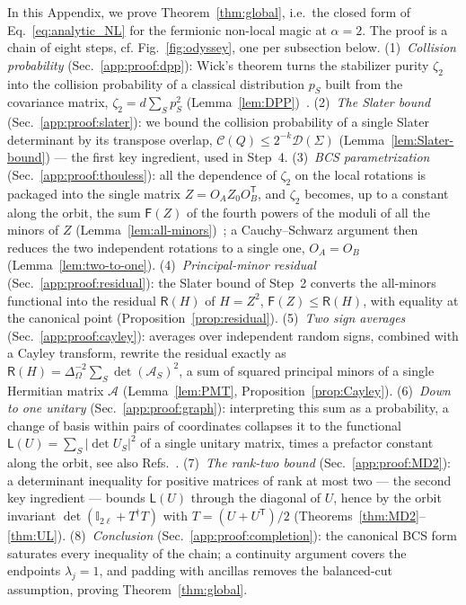 \documentclass[prx,twocolumn,superscriptaddress,aps,10pt, frontmatterverbose, reprint,footinbib,longbibliography=true]{revtex4-2}
\newcommand{\trans}{\mathsf{T}}
\newcommand{\RENYI}{\alpha}
\begin{document}
In this Appendix, we prove Theorem~\ref{thm:global}, i.e.\ the closed form of Eq.~\eqref{eq:analytic_NL} for the fermionic non-local magic at $\RENYI=2$. The proof is a chain of eight steps, cf. Fig.~\ref{fig:odyssey}, one per subsection below.
(1)~\emph{Collision probability} (Sec.~\ref{app:proof:dpp}):  Wick's theorem turns the stabilizer purity $\zeta_2$ into the collision probability of a classical distribution $p_S$  built from the covariance matrix, $\zeta_2=d\sum_Sp_S^2$ (Lemma~\ref{lem:DPP})~\cite{collura2026nonstabilizernessfermionicgaussianstates}.
(2)~\emph{The Slater bound}  (Sec.~\ref{app:proof:slater}): we bound the collision probability of a single Slater determinant by its transpose overlap, $\mathcal{C}(Q)\le2^{-k}\mathcal{D}(\Sigma)$ (Lemma~\ref{lem:Slater-bound}) --- the first key ingredient, used in Step~4.
(3)~\emph{BCS parametrization} (Sec.~\ref{app:proof:thouless}): all the dependence of $\zeta_2$ on the local rotations is packaged into the single matrix $Z=O_AZ_0O_B^{\trans}$, and $\zeta_2$ becomes, up to a constant along the orbit, the sum $\mathsf{F}(Z)$ of the fourth powers of the moduli of all the minors of $Z$ (Lemma~\ref{lem:all-minors})~\cite{Mbeng2024,surace}; a Cauchy--Schwarz argument then reduces the two independent rotations to a single one, $O_A=O_B$  (Lemma~\ref{lem:two-to-one}).
(4)~\emph{Principal-minor residual} (Sec.~\ref{app:proof:residual}): the Slater bound of Step~2  converts the all-minors functional into the residual  $\mathsf{R}(H)$ of $H=Z^2$, $\mathsf{F}(Z)\le\mathsf{R}(H)$, with equality at the canonical point (Proposition~\ref{prop:residual}).
(5)~\emph{Two sign averages} (Sec.~\ref{app:proof:cayley}): averages over independent random signs, combined with a Cayley transform, rewrite the residual exactly as $\mathsf{R}(H)=\Delta_\Omega^{-2}\sum_S\det(\mathcal{A}_S)^2$, a sum of squared principal minors of a single Hermitian matrix $\mathcal{A}$ (Lemma~\ref{lem:PMT}, Proposition~\ref{prop:Cayley}).
(6)~\emph{Down to one unitary} (Sec.~\ref{app:proof:graph}): interpreting this sum as a probability, a change of basis within pairs of coordinates collapses it to the functional $\mathsf{L}(U)=\sum_S|\det U_S|^2$ of a single unitary matrix, times a prefactor constant along the orbit, see also Refs.~\cite{collura2026nonstabilizernessfermionicgaussianstates,sfeo}.
(7)~\emph{The rank-two bound} (Sec.~\ref{app:proof:MD2}): a determinant inequality for positive matrices of rank at most two --- the second key ingredient --- bounds $\mathsf{L}(U)$ through the diagonal of $U$, hence by the orbit invariant $\det(\mathbb{I}_{2\ell}+T^\dagger T)$ with $T=(U+U^{\trans})/2$ (Theorems~\ref{thm:MD2}--\ref{thm:UL}).
(8)~\emph{Conclusion} (Sec.~\ref{app:proof:completion}): the canonical BCS form saturates every inequality of the chain; a continuity argument covers the endpoints $\lambda_j=1$, and padding with ancillas removes the balanced-cut assumption, proving Theorem~\ref{thm:global}.
\end{document}
